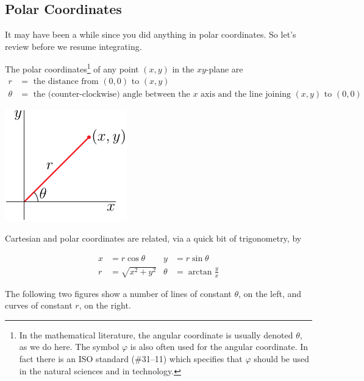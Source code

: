 \subsection{Polar Coordinates} \label{sec polar coords}
It may have been a while since you did anything in polar coordinates.
So let's review before we resume integrating.
\begin{defn}\label{def polars}
The polar coordinates\footnote{In the mathematical literature,
the angular coordinate is usually denoted $\theta$, as we do here.
The symbol $\varphi$ is also often used for the angular coordinate.
In fact there is an ISO standard (\#31--11) which specifies 
that $\varphi$ should be used in the natural sciences and in technology.} 
of any point $(x,y)$ in the $xy$-plane are
\begin{align*}
r&=\text{ the distance from }(0,0)\text{ to }(x,y)\\
\theta&=\text{ the (counter-clockwise) angle between the $x$ axis 
               and the line joining $(x,y)$ to $(0,0)$}
\end{align*}
\begin{efig}
\begin{center}
    \includegraphics{polar.pdf}
\end{center}
\end{efig}
\end{defn}
Cartesian and polar coordinates are related, via a quick bit
of trigonometry, by
\begin{impeqn}\label{eqn polars}
\begin{align*}
x&=r\cos\theta &
y&=r\sin\theta  \\
    r&=\sqrt{x^2+y^2} &
    \theta&=\arctan\frac{y}{x}
\end{align*}
\end{impeqn}
The following two figures show a number of lines of constant $\theta$,
on the left, and curves of constant $r$, on the right.
